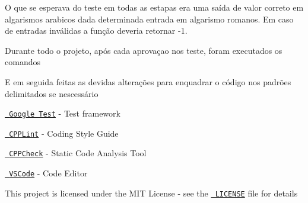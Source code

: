 O que se esperava do teste em todas as estapas era uma saída de valor correto em algarismos arabicos dada determinada entrada em algarismo romanos. Em caso de entradas inválidas a função deveria retornar -\/1.

Durante todo o projeto, após cada aprovaçao nos teste, foram executados os comandos 
\begin{DoxyCode}{0}
\end{DoxyCode}
 E em seguida feitas as devidas alterações para enquadrar o código nos padrões delimitados se nescessário


\begin{DoxyItemize}
\item \href{https://github.com/google/googletest}{\texttt{ Google Test}} -\/ Test framework
\item \href{https://github.com/cpplint/cpplint}{\texttt{ C\+P\+P\+Lint}} -\/ Coding Style Guide
\item \href{cppcheck.sourceforge.net}{\texttt{ C\+P\+P\+Check}} -\/ Static Code Analysis Tool
\item \href{https://code.visualstudio.com}{\texttt{ V\+S\+Code}} -\/ Code Editor
\end{DoxyItemize}

This project is licensed under the M\+IT License -\/ see the \href{https://opensource.org/licenses/MIT}{\texttt{ L\+I\+C\+E\+N\+SE}} file for details 